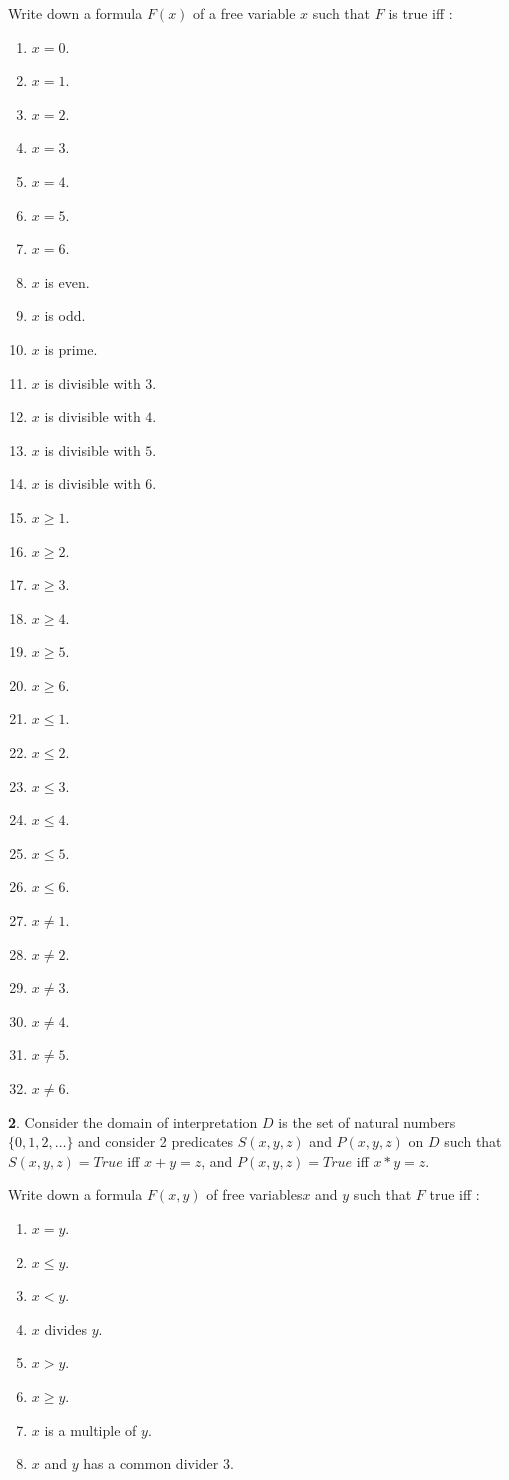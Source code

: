 \documentclass{article}
\begin{document}
Write down a formula $F(x)$ of a free variable $x$ such that $F$ is true iff :
\begin{enumerate}
	\item $x=0$.
	\item $x=1$.
	\item $x=2$.
	\item $x=3$.
	\item $x=4$.
	\item $x=5$.
	\item $x=6$.
	\item $x$ is even.
	\item $x$ is odd.
	\item $x$ is prime.
	\item $x$ is divisible with $3$.
	\item $x$ is divisible with $4$.
        \item $x$ is divisible with $5$.
        \item $x$ is divisible with $6$.
        \item $x\ge 1$.
        \item $x\ge 2$.
        \item $x\ge 3$.
        \item $x\ge 4$.
        \item $x\ge 5$.
        \item $x\ge 6$.
        \item $x\le 1$.
        \item $x\le 2$.
        \item $x\le 3$.
        \item $x\le 4$.
        \item $x\le 5$.
        \item $x\le 6$.
        \item $x\ne 1$.
        \item $x\ne 2$.
        \item $x\ne 3$.
        \item $x\ne 4$.
        \item $x\ne 5$.
        \item $x\ne 6$.
\end{enumerate}

\bigskip

{\bf 2}. Consider the domain of interpretation $D$ is the set of natural numbers $\{0, 1, 2, \dots\}$ and consider 2 predicates $S(x,y,z)$ and $P(x,y,z)$ on $D$ such that $S(x,y,z) = True$ iff $x+y = z$, and $P(x,y,z) = True$ iff $x*y = z$.  

Write down a formula $F(x,y)$ of free variables$x$ and $y$ such that $F$ true iff :
\begin{enumerate}
\item $x=y$.
\item $x\le{y}$.
\item $x<y$.
\item $x$ divides $y$.
\item $x>y$.
\item $x\ge{y}$.
\item $x$ is a multiple of  $y$.
\item $x$ and $y$ has a common divider $3$.
\end{enumerate}
\end{document}
